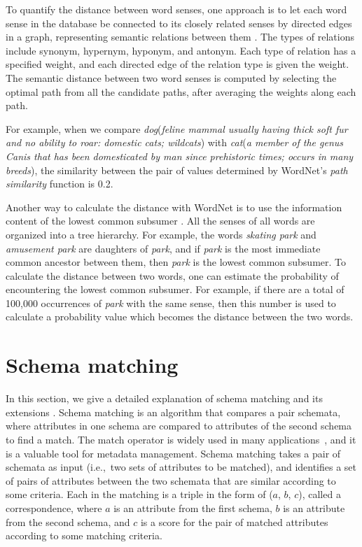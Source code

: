 To quantify the distance between word senses, one approach is to let each word sense in the database be connected to its closely related senses by directed edges in a graph, representing semantic relations between them \cite{cruz2005role}. The types of relations include synonym, hypernym, hyponym, and antonym. Each type of relation has a specified weight, and each directed edge of the relation type is given the weight. The semantic distance between two word senses is computed by selecting the optimal path from all the candidate paths, after averaging the weights along each path.

For example, when we compare \textit{dog}(\textit{feline mammal usually having thick soft fur and no ability to roar: domestic cats; wildcats}) with \textit{cat}(\textit{a member of the genus Canis that has been domesticated by man since prehistoric times; occurs in many breeds}), the similarity between the pair of values determined by WordNet's \textit{path similarity} function is 0.2.

Another way to calculate the distance with WordNet is to use the information content of the lowest common subsumer \cite{Resnik1970Using}. All the senses of all words are organized into a tree hierarchy. For example, the words \textit{skating park} and \textit{amusement park} are daughters of \textit{park}, and if \textit{park} is the most immediate common ancestor between them, then \textit{park} is the lowest common subsumer. To calculate the distance between two words, one can estimate the probability of encountering the lowest common subsumer. For example, if there are a total of 100,000 occurrences of \textit{park} with the same sense, then this number is used to calculate a probability value which becomes the distance between the two words.

\section{Schema matching}
\label{sec:SchemaMatching}

In this section, we give a detailed explanation of schema matching and its extensions \cite{Rahm2001Survey}. Schema matching is an algorithm that compares a pair schemata, where attributes in one schema are compared to attributes of the second schema to find a match. The match operator is widely used in many applications~\cite{Dong2012Proceedings,Rahm2001Survey,10.1145/3183713.3183729}, and it is a valuable tool for metadata management. Schema matching takes a pair of schemata as input (i.e.,~two sets of attributes to be matched), and identifies a set of pairs of attributes between the two schemata that are similar according to some criteria. Each in the matching is a triple in the form of ($a$, $b$, $c$), called a correspondence, where $a$ is an attribute from the first schema, $b$ is an attribute from the second schema, and $c$ is a score for the pair of matched attributes according to some matching criteria.


